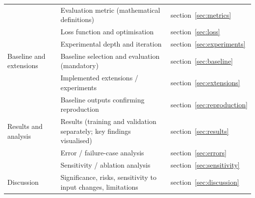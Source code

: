 \documentclass[11pt,a4paper]{article}
\begin{document}
\begin{center}
\begin{longtable}{>{\raggedright\arraybackslash}p{3.91cm}>{\raggedright\arraybackslash}p{8.40cm}>{\raggedright\arraybackslash}p{2.93cm}}
\hspace{0pt} & \hspace{0pt}Evaluation metric (mathematical definitions) & \hspace{0pt}section~\ref{sec:metrics}\\
\hspace{0pt} & \hspace{0pt}Loss function and optimisation & \hspace{0pt}section~\ref{sec:loss}\\
\hspace{0pt} & \hspace{0pt}Experimental depth and iteration & \hspace{0pt}section~\ref{sec:experiments}\\
\hspace{0pt}Baseline and extensions & \hspace{0pt}Baseline selection and evaluation (mandatory) & \hspace{0pt}section~\ref{sec:baseline}\\
\hspace{0pt} & \hspace{0pt}Implemented extensions /\allowbreak{} experiments & \hspace{0pt}section~\ref{sec:extensions}\\
\hspace{0pt} & \hspace{0pt}Baseline outputs confirming reproduction & \hspace{0pt}section~\ref{sec:reproduction}\\
\hspace{0pt}Results and analysis & \hspace{0pt}Results (training and validation separately; key findings visualised) & \hspace{0pt}section~\ref{sec:results}\\
\hspace{0pt} & \hspace{0pt}Error /\allowbreak{} failure-case analysis & \hspace{0pt}section~\ref{sec:errors}\\
\hspace{0pt} & \hspace{0pt}Sensitivity /\allowbreak{} ablation analysis & \hspace{0pt}section~\ref{sec:sensitivity}\\
\hspace{0pt}Discussion & \hspace{0pt}Significance, risks, sensitivity to input changes, limitations & \hspace{0pt}section~\ref{sec:discussion}\\

\end{longtable}
\end{center}
\end{document}
